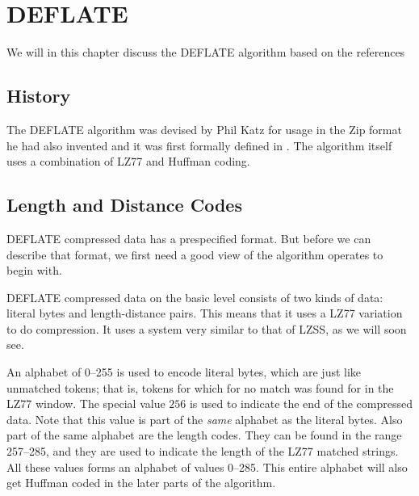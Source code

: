 \begin{comment}
  
\end{comment}

\chapter{DEFLATE}
\label{cha:deflate}

We will in this chapter discuss the DEFLATE algorithm based on the
references
\cite{pkware:_appnot,deutsch96:_deflat_compr_data_format_specif,Salomon:2004:DCC,feldspar:_explan_deflat_algor}

\section{History}

The DEFLATE algorithm was devised by Phil Katz for usage in the Zip
format he had also invented and it was first formally defined in
\cite{deutsch96:_deflat_compr_data_format_specif}. The algorithm
itself uses a combination of LZ77 and Huffman coding.

\section{Length and Distance Codes}

DEFLATE compressed data has a prespecified format. But before we can
describe that format, we first need a good view of the algorithm
operates to begin with.

DEFLATE compressed data on the basic level consists of two kinds of
data: literal bytes and length-distance pairs. This means that it uses
a LZ77 variation to do compression. It uses a system very similar to
that of LZSS, as we will soon see.

An alphabet of 0--255 is used to encode literal bytes, which are just
like unmatched tokens; that is, tokens for which for no match was
found for in the LZ77 window. The special value $256$ is used to
indicate the end of the compressed data. Note that this value is part
of the \textit{same} alphabet as the literal bytes. Also part of the
same alphabet are the length codes. They can be found in the range
257--285, and they are used to indicate the length of the LZ77 matched
strings. All these values forms an alphabet of values 0--285. This
entire alphabet will also get Huffman coded in the later parts of the
algorithm.

